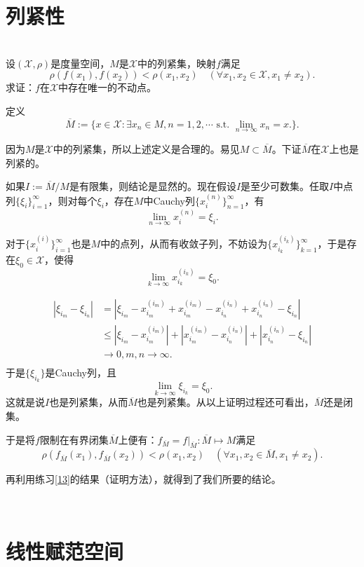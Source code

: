 \section{列紧性}
\begin{exercise}
\hfill\\
设$(\mathscr{X},\rho)$是度量空间，$M$是$\mathscr{X}$中的列紧集，映射$f$满足
$$\rho(f(x_1),f(x_2))<\rho(x_1,x_2)\quad(\forall x_1,x_2\in\mathscr{X},x_1\neq x_2).$$
求证：$f$在$\mathscr{X}$中存在唯一的不动点。

定义
$$\overline{M}:=\{x\in\mathscr{X}:\exists x_n\in M,n=1,2,\cdots\text{ s.t. }\lim_{n\rightarrow\infty}x_n=x.\}.$$

因为$M$是$\mathscr{X}$中的列紧集，所以上述定义是合理的。易见$M\subset\overline{M}$。下证$\overline{M}$在$\mathscr{X}$上也是列紧的。

如果$I:=\overline{M}/M$是有限集，则结论是显然的。现在假设$I$是至少可数集。任取$I$中点列$\{\xi_i\}_{i=1}^{\infty}$，则对每个$\xi_i$，存在$M$中Cauchy列$\{x_i^{(n)}\}_{n=1}^{\infty}$，有
$$\lim_{n\rightarrow\infty}x_i^{(n)}=\xi_i.$$


对于$\{x_i^{(i)}\}_{i=1}^{\infty}$也是$M$中的点列，从而有收敛子列，不妨设为$\{x_{i_k}^{(i_k)}\}_{k=1}^{\infty}$，于是存在$\xi_0\in\mathscr{X}$，使得
$$\lim_{k\rightarrow\infty}x_{i_k}^{(i_k)}=\xi_0.$$

\begin{align*}
|\xi_{i_m}-\xi_{i_n}|&=|\xi_{i_m}-x_{i_m}^{(i_m)}+x_{i_m}^{(i_m)}-x_{i_n}^{(i_n)}+x_{i_n}^{(i_n)}-\xi_{i_n}|\\
&\leq|\xi_{i_m}-x_{i_m}^{(i_m)}|+|x_{i_m}^{(i_m)}-x_{i_n}^{(i_n)}|+|x_{i_n}^{(i_n)}-\xi_{i_n}|\\
&\rightarrow0,m,n\rightarrow\infty.\\
\end{align*}
于是$\{\xi_{i_k}\}$是Cauchy列，且
$$\lim_{k\rightarrow\infty}\xi_{i_k}=\xi_0.$$
这就是说$I$也是列紧集，从而$\overline{M}$也是列紧集。从以上证明过程还可看出，$\overline{M}$还是闭集。

于是将$f$限制在有界闭集$\overline{M}$上便有：$f_{\overline{M}}=f|_{\overline{M}}:\overline{M}\mapsto M$满足
$$\rho(f_{\overline{M}}(x_1),f_{\overline{M}}(x_2))<\rho(x_1,x_2)\quad(\forall x_1,x_2\in\overline{M},x_1\neq x_2).$$

再利用练习\ref{13}的结果（证明方法），就得到了我们所要的结论。
\end{exercise}
\hfill\\
\section{线性赋范空间}

